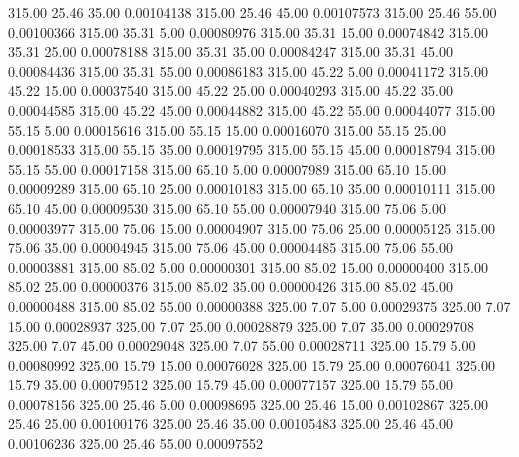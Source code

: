     315.00     25.46     35.00     0.00104138
    315.00     25.46     45.00     0.00107573
    315.00     25.46     55.00     0.00100366
    315.00     35.31      5.00     0.00080976
    315.00     35.31     15.00     0.00074842
    315.00     35.31     25.00     0.00078188
    315.00     35.31     35.00     0.00084247
    315.00     35.31     45.00     0.00084436
    315.00     35.31     55.00     0.00086183
    315.00     45.22      5.00     0.00041172
    315.00     45.22     15.00     0.00037540
    315.00     45.22     25.00     0.00040293
    315.00     45.22     35.00     0.00044585
    315.00     45.22     45.00     0.00044882
    315.00     45.22     55.00     0.00044077
    315.00     55.15      5.00     0.00015616
    315.00     55.15     15.00     0.00016070
    315.00     55.15     25.00     0.00018533
    315.00     55.15     35.00     0.00019795
    315.00     55.15     45.00     0.00018794
    315.00     55.15     55.00     0.00017158
    315.00     65.10      5.00     0.00007989
    315.00     65.10     15.00     0.00009289
    315.00     65.10     25.00     0.00010183
    315.00     65.10     35.00     0.00010111
    315.00     65.10     45.00     0.00009530
    315.00     65.10     55.00     0.00007940
    315.00     75.06      5.00     0.00003977
    315.00     75.06     15.00     0.00004907
    315.00     75.06     25.00     0.00005125
    315.00     75.06     35.00     0.00004945
    315.00     75.06     45.00     0.00004485
    315.00     75.06     55.00     0.00003881
    315.00     85.02      5.00     0.00000301
    315.00     85.02     15.00     0.00000400
    315.00     85.02     25.00     0.00000376
    315.00     85.02     35.00     0.00000426
    315.00     85.02     45.00     0.00000488
    315.00     85.02     55.00     0.00000388
    325.00      7.07      5.00     0.00029375
    325.00      7.07     15.00     0.00028937
    325.00      7.07     25.00     0.00028879
    325.00      7.07     35.00     0.00029708
    325.00      7.07     45.00     0.00029048
    325.00      7.07     55.00     0.00028711
    325.00     15.79      5.00     0.00080992
    325.00     15.79     15.00     0.00076028
    325.00     15.79     25.00     0.00076041
    325.00     15.79     35.00     0.00079512
    325.00     15.79     45.00     0.00077157
    325.00     15.79     55.00     0.00078156
    325.00     25.46      5.00     0.00098695
    325.00     25.46     15.00     0.00102867
    325.00     25.46     25.00     0.00100176
    325.00     25.46     35.00     0.00105483
    325.00     25.46     45.00     0.00106236
    325.00     25.46     55.00     0.00097552
